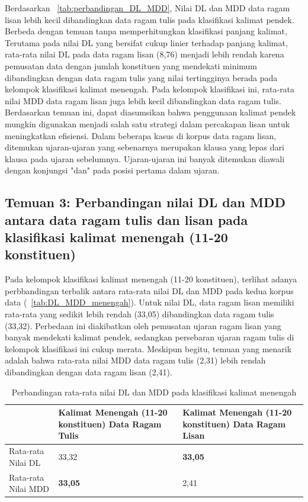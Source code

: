 Berdasarkan \tab~\ref{tab:perbandingan_DL_MDD}, Nilai DL dan MDD data ragam lisan lebih kecil dibandingkan data ragam tulis pada klasifikasi kalimat pendek. Berbeda dengan temuan tanpa memperhitungkan klasifikasi panjang kalimat, Terutama pada nilai DL yang bersifat cukup linier terhadap panjang kalimat, rata-rata nilai DL pada data ragam lisan (8,76) menjadi lebih rendah karena pemusatan data dengan jumlah konstituen yang mendekati minimum dibandingkan dengan data ragam tulis yang nilai tertingginya berada pada kelompok klasifikasi kalimat menengah. Pada kelompok klasifikasi ini, rata-rata nilai MDD data ragam lisan juga lebih kecil dibandingkan data ragam tulis. Berdasarkan temuan ini, dapat diasumsikan bahwa penggunaan kalimat pendek mungkin digunakan menjadi salah satu strategi dalam percakapan lisan untuk meningkatkan efisiensi. Dalam beberapa kasus di korpus data ragam lisan, ditemukan ujaran-ujaran yang sebenarnya merupakan klausa yang lepas dari klausa pada ujaran sebelumnya. Ujaran-ujaran ini banyak ditemukan diawali dengan konjungsi "dan" pada posisi pertama dalam ujaran. 

\subsection{Temuan 3: Perbandingan nilai DL dan MDD antara data ragam tulis dan lisan pada klasifikasi kalimat menengah (11-20 konstituen)}
Pada kelompok klasifikasi kalimat menengah (11-20 konstituen), terlihat adanya perbbandingan terbalik antara rata-rata nilai DL dan MDD pada kedua korpus data (\tab~\ref{tab:DL_MDD_menengah}). Untuk nilai DL, data ragam lisan memiliki rata-rata yang sedikit lebih rendah (33,05) dibandingkan data ragam tulis (33,32). Perbedaan ini diakibatkan oleh pemusatan ujaran ragam lisan yang banyak mendekati kalimat pendek, sedangkan persebaran ujaran ragam tulis di kelompok klasifikasi ini cukup merata. Meskipun begitu, temuan yang menarik adalah bahwa rata-rata nilai MDD data ragam tulis (2,31) lebih rendah dibandingkan dengan data ragam lisan (2,41). 

\begin{table}
\begin{center}
\label{table:DL_MDD_menengah}
 \caption{Perbandingan rata-rata nilai DL dan MDD pada klasifikasi kalimat menengah}  \begin{tabular}{ |p{4cm} | p{4cm} | p{4cm} |}
    \hline
 & Kalimat Menengah \newline (11-20 konstituen) \newline Data Ragam Tulis & Kalimat Menengah \newline (11-20 konstituen) \newline Data Ragam Lisan \\ \hline
 Rata-rata Nilai DL & 33,32 & \textbf{33,05} \\ \hline
 Rata-rata Nilai MDD & \textbf{33,05} & 2,41 \\ \hline
   \end{tabular}
\end{center}
\end{table}


